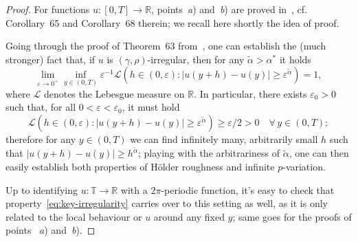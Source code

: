 \documentclass[11pt,oneside,reqno]{amsart}
\newcommand{\tmem}[1]{{\em #1\/}}
\numberwithin{equation}{section}
\begin{document}
\begin{proof}
  For functions $u : [0, T] \rightarrow \mathbb{R}$,
  points~{\tmem{a}}) and~{\tmem{b}}) are proved
  in~{\cite{galeati2020prevalence}}, cf. Corollary~65 and Corollary~68
  therein; we recall here shortly the idea of proof.
  
  Going through the proof of Theorem~63 from~{\cite{galeati2020prevalence}},
  one can establish the (much stronger) fact that, if $u$ is $(\gamma,
  \rho)$-irregular, then for any $\tilde{\alpha} > \alpha^{\ast}$ it holds
  \begin{equation}
    \lim_{\varepsilon \rightarrow 0^+} \inf_{y \in (0, T)} \varepsilon^{- 1}
    \mathcal{L} (h \in (0, \varepsilon) : | u (y + h) - u (y) | \geqslant
    \varepsilon^{\tilde{\alpha}}) = 1, \label{eq:key-irregularity}
  \end{equation}
  where $\mathcal{L}$ denotes the Lebesgue measure on $\mathbb{R}$. In
  particular, there exists $\varepsilon_0 > 0$ such that, for all $0 <
  \varepsilon < \varepsilon_0$, it must hold
  \[ \mathcal{L} (h \in (0, \varepsilon) : | u (y + h) - u (y) | \geqslant
     \varepsilon^{\tilde{\alpha}}) \geqslant \varepsilon / 2 > 0 \quad \forall
     \, y \in (0, T) ; \]
  therefore for any $y \in (0, T)$ we can find infinitely many, arbitrarily
  small $h$ such that $| u (y + h) - u (y) | \geqslant h^{\tilde{\alpha}}$;
  playing with the arbitrariness of $\tilde{\alpha}$, one can then easily
  establish both properties of H\"{o}lder roughness and infinite
  $p$\mbox{-}variation.
  
  Up to identifying $u : \mathbb{T} \rightarrow \mathbb{R}$ with a $2
  \pi$-periodic function, it's easy to check that
  property~\eqref{eq:key-irregularity} carries over to this setting as well,
  as it is only related to the local behaviour or $u$ around any fixed $y$;
  same goes for the proofs of points ~{\tmem{a}}) and~{\tmem{b}}).
  

\end{proof}
\end{document}
